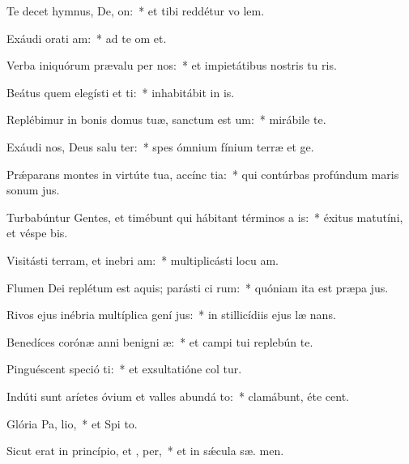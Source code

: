 \item Te decet hymnus, De,  on:~* et tibi reddétur vo  lem.
\item Exáudi orati am:~* ad te om  et.
\item Verba iniquórum prævalu per nos:~* et impietátibus nostris tu ris.
\item Beátus quem elegísti et ti:~* inhabitábit in  is.
\item Replébimur in bonis domus tuæ, sanctum est  um:~* mirábile  te.
\item Exáudi nos, Deus salu ter:~* spes ómnium fínium terræ et   ge.
\item Prǽparans montes in virtúte tua, accínc tia:~* qui contúrbas profúndum maris sonum  jus.
\item Turbabúntur Gentes, et timébunt qui hábitant términos a  is:~* éxitus matutíni, et véspe bis.
\item Visitásti terram, et inebri am:~* multiplicásti locu am.
\item Flumen Dei replétum est aquis; parásti ci rum:~* quóniam ita est præpa jus.
\item Rivos ejus inébria multíplica gení jus:~* in stillicídiis ejus læ nans.
\item Benedíces corónæ anni benigni æ:~* et campi tui replebún te.
\item Pinguéscent speció ti:~* et exsultatióne col tur.
\item Indúti sunt aríetes óvium et valles abundá to:~* clamábunt, éte  cent.
\item Glória Pa,  lio,~* et Spi to.
\item Sicut erat in princípio, et ,  per,~* et in sǽcula sæ. men.
